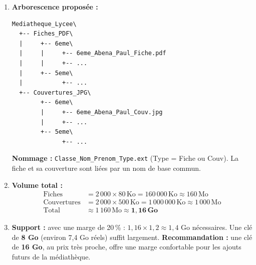 \documentclass[11pt]{article}
\begin{document}
\begin{corrige}[Exercice 3]
\begin{enumerate}
    \item \textbf{Arborescence proposée :}
    \begin{lstlisting}
Mediatheque_Lycee\
  +-- Fiches_PDF\
  |     +-- 6eme\
  |     |     +-- 6eme_Abena_Paul_Fiche.pdf
  |     |     +-- ...
  |     +-- 5eme\
  |           +-- ...
  +-- Couvertures_JPG\
        +-- 6eme\
        |     +-- 6eme_Abena_Paul_Couv.jpg
        |     +-- ...
        +-- 5eme\
              +-- ...
    \end{lstlisting}
    \textbf{Nommage :} \texttt{Classe\_Nom\_Prenom\_Type.ext} (Type = Fiche ou Couv). La fiche et sa couverture sont liées par un nom de base commun.
    \item \textbf{Volume total :}
    \begin{align*}
        \text{Fiches} &= 2\,000 \times 80\,\text{Ko} = 160\,000\,\text{Ko} \approx 160\,\text{Mo} \\
        \text{Couvertures} &= 2\,000 \times 500\,\text{Ko} = 1\,000\,000\,\text{Ko} \approx 1\,000\,\text{Mo} \\
        \text{Total} &\approx 1\,160\,\text{Mo} \approx \mathbf{1{,}16\,\text{Go}}
    \end{align*}
    \item \textbf{Support :} avec une marge de 20\,\% : $1{,}16 \times 1{,}2 \approx 1{,}4$ Go nécessaires. Une clé de \textbf{8 Go} (environ 7,4 Go réels) suffit largement. \textbf{Recommandation :} une clé de \textbf{16 Go}, au prix très proche, offre une marge confortable pour les ajouts futurs de la médiathèque.
\end{enumerate}
\end{corrige}
\end{document}
